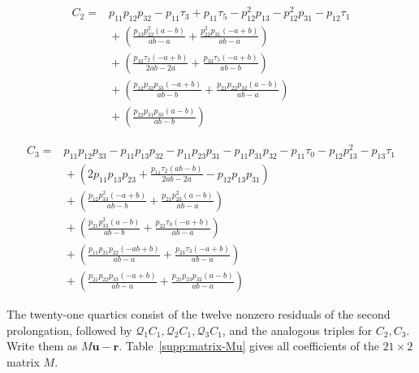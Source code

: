 \begin{equation}\label{supp:fnd:cubic2}
\begin{aligned}
C_2={}&p_{11} p_{12} p_{32} - p_{11} \tau_{3} + p_{11} \tau_{5} - p_{12}^{2} p_{13} - p_{12}^{2} p_{31} - p_{12} \tau_{1}\\
&{}+(\frac{p_{13} p_{22}^{2} \left(a - b\right)}{a b - a} + \frac{p_{22}^{2} p_{31} \left(- a + b\right)}{a b - a})\\
&{}+(\frac{p_{32} \tau_{2} \left(- a + b\right)}{2 a b - 2 a} + \frac{p_{33} \tau_{5} \left(- a + b\right)}{a b - b})\\
&{}+(\frac{p_{12} p_{32} p_{33} \left(- a + b\right)}{a b - b} + \frac{p_{21} p_{22} p_{32} \left(a - b\right)}{a b - a})\\
&{}+(\frac{p_{22} p_{31} p_{33} \left(a - b\right)}{a b - b})
\end{aligned}
\end{equation}

\begin{equation}\label{supp:fnd:cubic3}
\begin{aligned}
C_3={}&p_{11} p_{12} p_{33} - p_{11} p_{13} p_{32} - p_{11} p_{23} p_{31} - p_{11} p_{31} p_{32} - p_{11} \tau_{0} - p_{12} p_{13}^{2} - p_{13} \tau_{1}\\
&{}+(2 p_{11} p_{13} p_{23} + \frac{p_{11} \tau_{2} \left(a b - b\right)}{2 a b - 2 a} - p_{12} p_{13} p_{31})\\
&{}+(\frac{p_{12} p_{33}^{2} \left(- a + b\right)}{a b - b} + \frac{p_{21} p_{23}^{2} \left(a - b\right)}{a b - a})\\
&{}+(\frac{p_{21} p_{33}^{2} \left(a - b\right)}{a b - b} + \frac{p_{22} \tau_{0} \left(- a + b\right)}{a b - a})\\
&{}+(\frac{p_{11} p_{21} p_{22} \left(- a b + b\right)}{a b - a} + \frac{p_{23} \tau_{3} \left(- a + b\right)}{a b - a})\\
&{}+(\frac{p_{21} p_{22} p_{33} \left(- a + b\right)}{a b - a} + \frac{p_{21} p_{23} p_{32} \left(a - b\right)}{a b - a})
\end{aligned}
\end{equation}

The twenty-one quartics consist of the twelve nonzero residuals
of the second prolongation, followed by
$\mathcal Q_1C_1,\mathcal Q_2C_1,\mathcal Q_3C_1$, and the analogous
triples for $C_2,C_3$. Write them as
$M\boldsymbol u-\boldsymbol r$. Table~\ref{supp:matrix-Mu} gives all
coefficients of the $21\times2$ matrix $M$.

